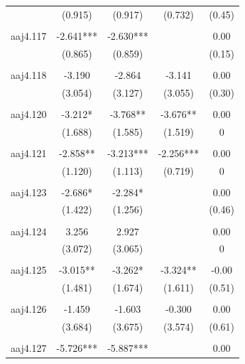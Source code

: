 \documentclass[12pt, a4paper]{article}
\begin{document}
{\begin{longtable}{@{\extracolsep{5pt}}lcccc}
				& (0.915)    & (0.917)    & (0.732)   & (0.45)  \\
				&            &            &           &         \\
				aaj4.117   & -2.641***  & -2.630***  &           & 0.00    \\
				& (0.865)    & (0.859)    &           & (0.15)  \\
				&            &            &           &         \\
				aaj4.118   & -3.190     & -2.864     & -3.141    & 0.00    \\
				& (3.054)    & (3.127)    & (3.055)   & (0.30)  \\
				&            &            &           &         \\
				aaj4.120   & -3.212*    & -3.768**   & -3.676**  & 0.00    \\
				& (1.688)    & (1.585)    & (1.519)   & 0       \\
				&            &            &           &         \\
				aaj4.121   & -2.858**   & -3.213***  & -2.256*** & 0.00    \\
				& (1.120)    & (1.113)    & (0.719)   & 0       \\
				&            &            &           &         \\
				aaj4.123   & -2.686*    & -2.284*    &           & 0.00    \\
				& (1.422)    & (1.256)    &           & (0.46)  \\
				&            &            &           &         \\
				aaj4.124   & 3.256      & 2.927      &           & 0.00    \\
				& (3.072)    & (3.065)    &           & 0       \\
				&            &            &           &         \\
				aaj4.125   & -3.015**   & -3.262*    & -3.324**  & -0.00   \\
				& (1.481)    & (1.674)    & (1.611)   & (0.51)  \\
				&            &            &           &         \\
				aaj4.126   & -1.459     & -1.603     & -0.300    & 0.00    \\
				& (3.684)    & (3.675)    & (3.574)   & (0.61)  \\
				&            &            &           &         \\
				aaj4.127   & -5.726***  & -5.887***  &           & 0.00    \\

\end{longtable}}
\end{document}
